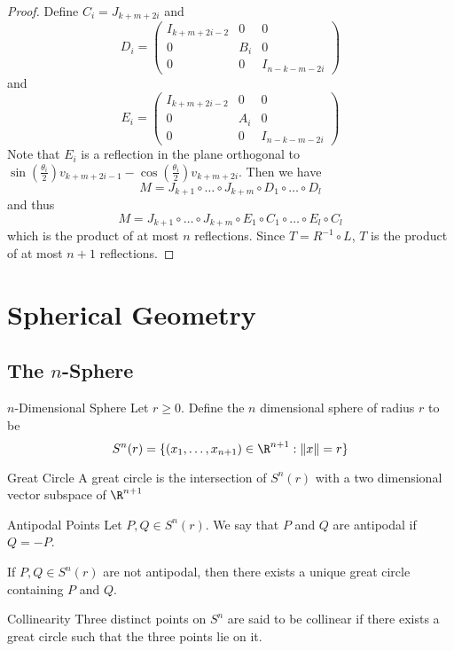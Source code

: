 \documentclass[a4paper]{article}
\begin{document}
\begin{thm}{}{}
\begin{proof}
Define $C_i=J_{k+m+2i}$ and $$D_i=\begin{pmatrix}
I_{k+m+2i-2} & 0 & 0\\
0 & B_i & 0\\
0 & 0 & I_{n-k-m-2i}
\end{pmatrix}$$ and $$E_i=\begin{pmatrix}
I_{k+m+2i-2} & 0 & 0\\
0 & A_i & 0\\
0 & 0 & I_{n-k-m-2i}
\end{pmatrix}$$
Note that $E_i$ is a reflection in the plane orthogonal to $\sin\left(\frac{\theta_i}{2}\right)v_{k+m+2i-1}-\cos\left(\frac{\theta_i}{2}\right)v_{k+m+2i}$. Then we have $$M=J_{k+1}\circ\dots\circ J_{k+m}\circ D_1\circ\dots\circ D_l$$ and thus $$M=J_{k+1}\circ\dots\circ J_{k+m}\circ E_1\circ C_1\circ\dots\circ E_l\circ C_l$$ which is the product of at most $n$ reflections. Since $T=R^{-1}\circ L$, $T$ is the product of at most $n+1$ reflections. 
\end{proof}
\end{thm}

\pagebreak
\section{Spherical Geometry}
\subsection{The $n$-Sphere}
\begin{defn}{$n$-Dimensional Sphere}{} Let $r\geq 0$. Define the $n$ dimensional sphere of radius $r$ to be $$S^n(r)=\{(x_1,\dots,x_{n+1})\in\R^{n+1}:\|x\|=r\}$$
\end{defn}

\begin{defn}{Great Circle}{} A great circle is the intersection of $S^n(r)$ with a two dimensional vector subspace of $\R^{n+1}$
\end{defn}

\begin{defn}{Antipodal Points}{} Let $P,Q\in S^n(r)$. We say that $P$ and $Q$ are antipodal if $Q=-P$. 
\end{defn}

\begin{lmm}{}{} If $P,Q\in S^n(r)$ are not antipodal, then there exists a unique great circle containing $P$ and $Q$. 
\end{lmm}

\begin{defn}{Collinearity}{} Three distinct points on $S^n$ are said to be collinear if there exists a great circle such that the three points lie on it. 
\end{defn}
\end{document}
